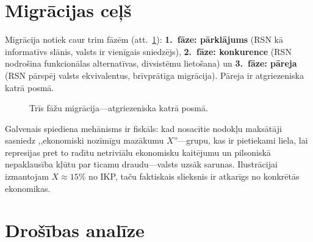 \documentclass[11pt,a4paper,twocolumn]{article}
\begin{document}
\section{Migrācijas ceļš}

Migrācija notiek caur trim fāzēm (att.~\ref{fig:migration}): \textbf{1.\ fāze: pārklājums} (RSN kā informatīvs slānis, valsts ir vienīgais sniedzējs), \textbf{2.\ fāze: konkurence} (RSN nodrošina funkcionālas alternatīvas, divsistēmu lietošana) un \textbf{3.\ fāze: pāreja} (RSN pārspēj valsts ekvivalentus, brīvprātīga migrācija). Pāreja ir atgriezeniska katrā posmā.

\begin{figure}[ht]
\centering
{}
\caption{Trīs fāžu migrācija---atgriezeniska katrā posmā.}
\label{fig:migration}
\end{figure}

Galvenais spiediena mehānisms ir fiskāls: kad nosacītie nodokļu maksātāji sasniedz ,,ekonomiski nozīmīgu mazākumu $X$''---grupu, kas ir pietiekami liela, lai represijas pret to radītu netriviālu ekonomisku kaitējumu un pilsoniskā nepaklausība kļūtu par ticamu draudu---valsts uzsāk sarunas. Ilustrācijai izmantojam $X \approx 15\%$ no IKP, taču faktiskais slieksnis ir atkarīgs no konkrētās ekonomikas.

\section{Drošības analīze}
\end{document}
